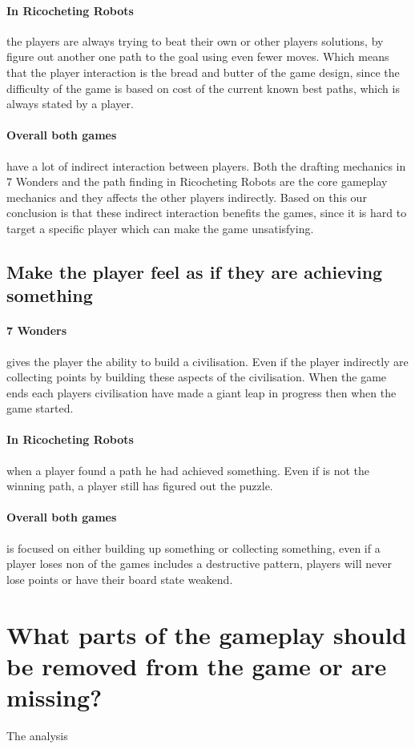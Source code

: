 \documentclass[a4paper]{article}
\begin{document}
\paragraph{In Ricocheting Robots} the players are always trying to beat their own or other players solutions, by figure out another one path to the goal using even fewer moves. Which means that the player interaction is the bread and butter of the game design, since the difficulty of the game is based on cost of the current known best paths, which is always stated by a player. 

\paragraph{Overall both games} have a lot of indirect interaction between players. Both the drafting mechanics in 7 Wonders and the path finding in Ricocheting Robots are the core gameplay mechanics and they affects the other players indirectly. Based on this our conclusion is that these indirect interaction benefits the games, since it is hard to target a specific player which can make the game unsatisfying.

\subsection{Make the player feel as if they are achieving something}
\paragraph{7 Wonders} gives the player the ability to build a civilisation. Even if the player indirectly are collecting points by building these aspects of the civilisation. When the game ends each players civilisation have made a giant leap in progress then when the game started. 

\paragraph{In Ricocheting Robots} when a player found a path he had achieved something. Even if is not the winning path, a player still has figured out the puzzle.

\paragraph{Overall both games} is focused on either building up something or collecting something, even if a player loses non of the games includes a destructive pattern, players will never lose points or have their board state weakend.

\section{What parts of the gameplay should be removed from the game or are missing?}
The analysis 


\newpage


\end{document}
